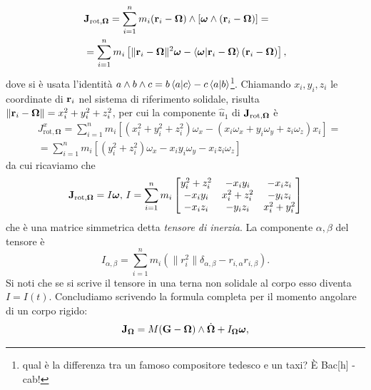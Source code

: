     \begin{equation}
        \begin{aligned}
           &\mathbf{J}_{\mathrm{rot},\boldsymbol{\Omega}} = \sum_{i=1}^nm_i(\mathbf{r}_i-\boldsymbol{\Omega})\wedge [\boldsymbol{\omega} \wedge (\mathbf{r}_i-\boldsymbol{\Omega})] = \\
           &=\sum_{i=1}^nm_i\left[\|\mathbf{r}_i-\boldsymbol{\Omega}\|^2\boldsymbol{\omega}-\braket{\boldsymbol{\omega}|\mathbf{r}_i-\boldsymbol{\Omega}}(\mathbf{r}_i-\boldsymbol{\Omega})\right],
           \label{jrot}
        \end{aligned}
    \end{equation}
    dove si è usata l'identità $a\wedge b\wedge c = b\braket{a|c}-c\braket{a|b}$\footnote{qual è la differenza tra un famoso compositore tedesco e un taxi? È Bac[h] - cab!}. Chiamando $x_i,y_i,z_i$ le coordinate di $\mathbf{r}_i$ nel sistema di riferimento solidale, risulta $\|\mathbf{r}_i-\boldsymbol{\Omega}\|=x_i^2+y_i^2+z_i^2$, per cui la componente $\hat{u}_1$ di $\mathbf{J}_{\mathrm{rot},\boldsymbol{\Omega}}$ è
    \begin{equation}
    \begin{aligned}
        &J^x_{\mathrm{rot},\boldsymbol{\Omega}} = \sum_{i=1}^nm_i\left[(x_i^2+y_i^2+z_i^2)\omega_x-(x_i\omega_x+y_i\omega_y+z_i\omega_z)x_i\right]=\\
        &=\sum_{i=1}^n m_i \left[(y_i^2+z_i^2)\omega_x -x_iy_i\omega_y-x_iz_i\omega_z\right]
    \end{aligned}
    \end{equation}
    da cui ricaviamo che
    \begin{equation}
        \mathbf{J}_{\mathrm{rot},\boldsymbol{\Omega}} = I\boldsymbol{\omega},\,I = \sum_{i=1}^n m_i
        \begin{bmatrix}
            y_i^2+z_i^2 & -x_iy_i & -x_iz_i\\
             -x_iy_i   & x_i^2+z_i^2 & -y_iz_i\\
              -x_iz_i & -y_iz_i &x_i^2+y_i^2
        \end{bmatrix}
    \end{equation}
    che è una matrice simmetrica detta \emph{tensore di inerzia}. La componente $\alpha,\beta$ del tensore è
    \begin{equation}
        I_{\alpha,\beta} = \sum_{i=1}^n m_i(\|r_i^2\|\delta_{\alpha,\beta}-r_{i,\alpha}r_{i,\beta}).
    \end{equation}
    Si noti che se si scrive il tensore in una terna non solidale al corpo esso diventa $I=I(t).$ 
    Concludiamo scrivendo la formula completa per il momento angolare di un corpo rigido: 
    \begin{equation}
        \mathbf{J}_{\boldsymbol{\Omega}} = M(\mathbf{G}-\boldsymbol{\Omega})\wedge \dot{\boldsymbol{\Omega}}+ I_{\boldsymbol{\Omega}}\boldsymbol{\omega},
    \end{equation}
